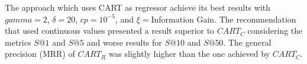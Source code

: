 \documentclass[10pt,letterpaper]{article}
\begin{document}
The approach which uses CART as regressor achieve its best results with \(gamma = 2\), \(\delta = 20\), \(cp = 10^{-5}\), and \(\xi = \)Information Gain. The recommendation that used continuous values ​​presented a result superior to \(CART_C\) considering the metrics \(S@1\) and \(S@5\) and worse results for \(S@10\) and \(S@50\). The general precision (MRR) of \(CART_R\) was slightly higher than the one achieved by \(CART_C\).



%
%
%
\end{document}
